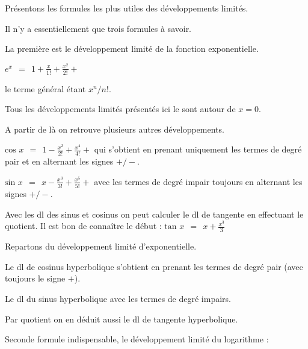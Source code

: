 







\debuttexte

\diapo

Présentons les formules les plus utiles des développements limités.

\change

Il n'y a essentiellement que trois formules à savoir.



La première est le développement limité de la fonction exponentielle.

$\displaystyle e^x \ \ =\ \  1 + \frac{x}{1!}+\frac{x^2}{2!}+$

le terme général étant $x^n/n!$.



Tous les développements limités présentés ici le sont autour de $x=0$.

A partir de là on retrouve plusieurs autres développements.


$\text{cos } x \ \ =\ \  1 - \frac{x^2}{2!}+\frac{x^4}{4!}+$
qui s'obtient en prenant uniquement les termes de degré pair et en alternant les signes $+/-$.

$\text{sin } x \ \ =\ \  x - \frac{x^3}{3!}+\frac{x^5}{5!}+$
avec les termes de degré impair toujours en alternant les signes $+/-$.

Avec les dl des sinus et cosinus on peut calculer le dl de tangente en effectuant le quotient.
Il est bon de connaître le début :
$\text{tan } x \ \ =\ \  x +  \frac{x^3}{3}$ 


\diapo

Repartons du développement limité d'exponentielle.

Le dl de cosinus hyperbolique s'obtient en prenant les termes de degré pair
(avec toujours le signe $+$).

Le dl du sinus hyperbolique avec les termes de degré impairs.

Par quotient on en déduit aussi le dl de tangente hyperbolique.


\diapo


Seconde formule indispensable, le développement limité du logarithme :

